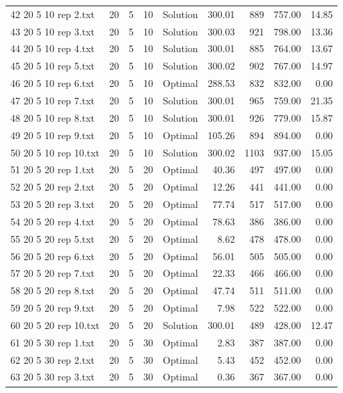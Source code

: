 \begin{longtable}{lrrllrrrr}
42 20 5 10 rep 2.txt & 20 & 5 & 10 & Solution & 300.01 & 889 & 757.00 & 14.85\\
43 20 5 10 rep 3.txt & 20 & 5 & 10 & Solution & 300.03 & 921 & 798.00 & 13.36\\
44 20 5 10 rep 4.txt & 20 & 5 & 10 & Solution & 300.01 & 885 & 764.00 & 13.67\\
45 20 5 10 rep 5.txt & 20 & 5 & 10 & Solution & 300.02 & 902 & 767.00 & 14.97\\
46 20 5 10 rep 6.txt & 20 & 5 & 10 & Optimal & 288.53 & 832 & 832.00 &  0.00\\
47 20 5 10 rep 7.txt & 20 & 5 & 10 & Solution & 300.01 & 965 & 759.00 & 21.35\\
48 20 5 10 rep 8.txt & 20 & 5 & 10 & Solution & 300.01 & 926 & 779.00 & 15.87\\
49 20 5 10 rep 9.txt & 20 & 5 & 10 & Optimal & 105.26 & 894 & 894.00 &  0.00\\
50 20 5 10 rep 10.txt & 20 & 5 & 10 & Solution & 300.02 & 1103 & 937.00 & 15.05\\
51 20 5 20 rep 1.txt & 20 & 5 & 20 & Optimal & 40.36 & 497 & 497.00 &  0.00\\
52 20 5 20 rep 2.txt & 20 & 5 & 20 & Optimal & 12.26 & 441 & 441.00 &  0.00\\
53 20 5 20 rep 3.txt & 20 & 5 & 20 & Optimal & 77.74 & 517 & 517.00 &  0.00\\
54 20 5 20 rep 4.txt & 20 & 5 & 20 & Optimal & 78.63 & 386 & 386.00 &  0.00\\
55 20 5 20 rep 5.txt & 20 & 5 & 20 & Optimal &  8.62 & 478 & 478.00 &  0.00\\
56 20 5 20 rep 6.txt & 20 & 5 & 20 & Optimal & 56.01 & 505 & 505.00 &  0.00\\
57 20 5 20 rep 7.txt & 20 & 5 & 20 & Optimal & 22.33 & 466 & 466.00 &  0.00\\
58 20 5 20 rep 8.txt & 20 & 5 & 20 & Optimal & 47.74 & 511 & 511.00 &  0.00\\
59 20 5 20 rep 9.txt & 20 & 5 & 20 & Optimal &  7.98 & 522 & 522.00 &  0.00\\
60 20 5 20 rep 10.txt & 20 & 5 & 20 & Solution & 300.01 & 489 & 428.00 & 12.47\\
61 20 5 30 rep 1.txt & 20 & 5 & 30 & Optimal &  2.83 & 387 & 387.00 &  0.00\\
62 20 5 30 rep 2.txt & 20 & 5 & 30 & Optimal &  5.43 & 452 & 452.00 &  0.00\\
63 20 5 30 rep 3.txt & 20 & 5 & 30 & Optimal &  0.36 & 367 & 367.00 &  0.00\\

\end{longtable}
